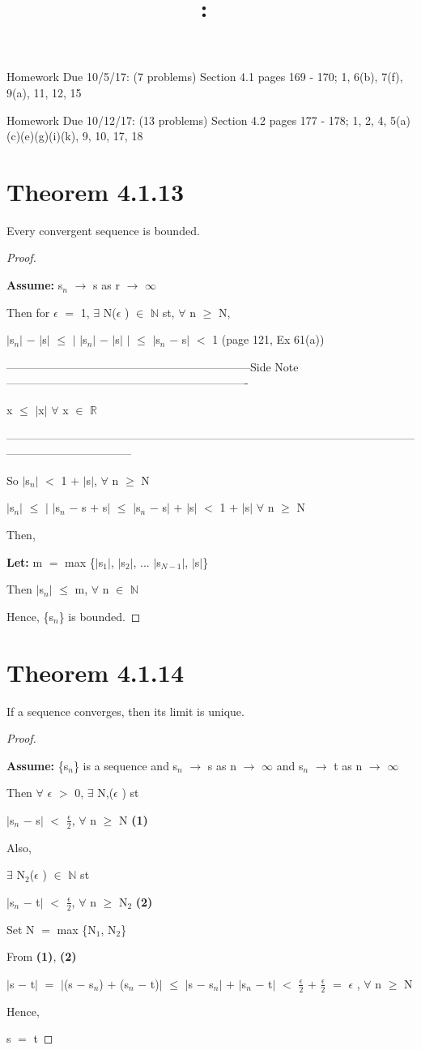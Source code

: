 \documentclass{article}
\title{
    \vspace{2in}
    \textmd{\textbf{\hmwkClass:\ \hmwkTitle}}\\
    \normalsize\vspace{0.1in}\small\vspace{0.1in}\large{\textit{\hmwkClassInstructor}}
    \vspace{3in}
}
\author{\hmwkAuthorName}
\date{}
\newcommand{\mt}[1]{\ensuremath{#1}}
\newcommand\bsc[2][\DefaultOpt]{%
  \def\DefaultOpt{#2}%
  \section[#1]{#2}%
}
\newcommand{\bgpf}{\begin{proof} $ $\newline}
\newcommand{\lt}[1]{\textbf{Let: } #1}
\newcommand{\as}[1]{\textbf{Assume: } #1}
\newcommand{\bpth}[1]{\textbf{(#1)}}
\newcommand{\epf}{\end{proof}}
\newcommand{\sidenote}[1]{-----------------------------------------------------------------Side Note----------------------------------------------------------------
#1 \

---------------------------------------------------------------------------------------------------------------------------------------------}
\newcommand{\br}{\mt{\mathbb{R}} }       %
\newcommand{\bn}{\mt{\mathbb{N}} }       %
\newcommand{\ep}{\mt{\epsilon} }         %
\newcommand{\fa}{\mt{\forall} }          %
\newcommand{\mem}{\mt{\in} }
\newcommand{\exs}{\mt{\exists} }
\newcommand{\lra}{ \mt{\longrightarrow} } %
\newcommand{\eql}{\mt{=} }
\newcommand{\uw}[2]{#1\mt{_{#2}}}
\newcommand{\frc}[2]{\mt{\frac{#1}{#2}}}
\begin{document}
Homework Due 10/5/17: (7 problems) Section 4.1 pages 169 - 170; 1, 6(b), 7(f), 9(a), 11, 12, 15

Homework Due 10/12/17: (13 problems) Section 4.2 pages 177 - 178; 1, 2, 4, 5(a)(c)(e)(g)(i)(k), 9, 10, 17, 18

\bsc{Theorem 4.1.13}{

Every convergent sequence is bounded.

\bgpf

\as{\uw{s}{n} \lra s as r \lra $\infty$}

Then for \ep \eql 1, \exs N(\ep) \mem \bn st, \fa n $\geq$ N,

$|$\uw{s}{n}$|$ $-$ $|$s$|$ $\leq$ $|$ $|$\uw{s}{n}$|$ $-$ $|$s$|$ $|$ $\leq$ $|$\uw{s}{n} $-$ s$|$ $<$ 1  (page 121, Ex 61(a))

\sidenote{
x $\leq$ $|$x$|$ \fa x \mem \br
}

So $|$\uw{s}{n}$|$ $<$ 1 $+$ $|$s$|$, \fa n $\geq$ N

$|$\uw{s}{n}$|$ $\leq$ $|$ $|$\uw{s}{n} $-$ s $+$ s$|$ $\leq$ $|$\uw{s}{n} $-$ s$|$ $+$ $|$s$|$ $<$ 1 $+$ $|$s$|$ \fa n $\geq$ N

Then,

\lt{m \eql max \{$|$\uw{s}{1}$|$, $|$\uw{s}{2}$|$, ... $|$\uw{s}{N - 1}$|$, $|$s$|$}\}

Then $|$\uw{s}{n}$|$ $\leq$ m, \fa n \mem \bn

Hence, \{\uw{s}{n}\} is bounded.

\epf

}

\bsc{Theorem 4.1.14}{

If a sequence converges, then its limit is unique.

\bgpf

\as{\{\uw{s}{n}\} is a sequence and \uw{s}{n} \lra s as n \lra $\infty$ and \uw{s}{n} \lra t as n \lra $\infty$}

Then \fa \ep $>$ 0, \exs N,(\ep) st

$|$\uw{s}{n} $-$ s$|$ $<$ \frc{\epsilon}{2}, \fa n $\geq$ N \bpth{1}

Also,

\exs \uw{N}{2}(\ep) \mem \bn st

$|$\uw{s}{n} $-$ t$|$ $<$ \frc{\ep}{2}, \fa n $\geq$ \uw{N}{2} \bpth{2}

Set N \eql max \{\uw{N}{1}, \uw{N}{2}\}

From \bpth{1}, \bpth{2}

$|$s $-$ t$|$ \eql $|$(s $-$ \uw{s}{n}) $+$ (\uw{s}{n} $-$ t)$|$ $\leq$ $|$s $-$ \uw{s}{n}$|$ $+$ $|$\uw{s}{n} $-$ t$|$ $<$ \frc{\epsilon}{2} $+$ \frc{\epsilon}{2} \eql \ep, \fa n $\geq$ N

Hence,

s \eql t

\epf

}
\end{document}
